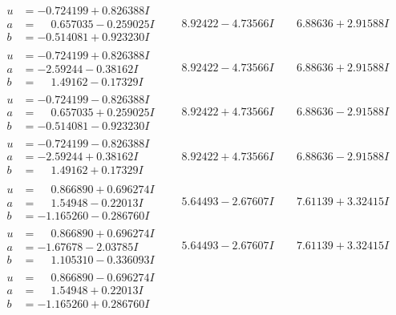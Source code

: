 \documentclass[1p]{elsarticle_modified}
\theoremstyle{definition}
\begin{document}
$$\begin{array}{c|c|c}
\begin{aligned}
u &= -0.724199 + 0.826388 I \\
a &= \phantom{-}0.657035 - 0.259025 I \\
b &= -0.514081 + 0.923230 I\end{aligned}
 & \phantom{-}8.92422 - 4.73566 I & \phantom{-}6.88636 + 2.91588 I \\ \hline\begin{aligned}
u &= -0.724199 + 0.826388 I \\
a &= -2.59244 - 0.38162 I \\
b &= \phantom{-}1.49162 - 0.17329 I\end{aligned}
 & \phantom{-}8.92422 - 4.73566 I & \phantom{-}6.88636 + 2.91588 I \\ \hline\begin{aligned}
u &= -0.724199 - 0.826388 I \\
a &= \phantom{-}0.657035 + 0.259025 I \\
b &= -0.514081 - 0.923230 I\end{aligned}
 & \phantom{-}8.92422 + 4.73566 I & \phantom{-}6.88636 - 2.91588 I \\ \hline\begin{aligned}
u &= -0.724199 - 0.826388 I \\
a &= -2.59244 + 0.38162 I \\
b &= \phantom{-}1.49162 + 0.17329 I\end{aligned}
 & \phantom{-}8.92422 + 4.73566 I & \phantom{-}6.88636 - 2.91588 I \\ \hline\begin{aligned}
u &= \phantom{-}0.866890 + 0.696274 I \\
a &= \phantom{-}1.54948 - 0.22013 I \\
b &= -1.165260 - 0.286760 I\end{aligned}
 & \phantom{-}5.64493 - 2.67607 I & \phantom{-}7.61139 + 3.32415 I \\ \hline\begin{aligned}
u &= \phantom{-}0.866890 + 0.696274 I \\
a &= -1.67678 - 2.03785 I \\
b &= \phantom{-}1.105310 - 0.336093 I\end{aligned}
 & \phantom{-}5.64493 - 2.67607 I & \phantom{-}7.61139 + 3.32415 I \\ \hline\begin{aligned}
u &= \phantom{-}0.866890 - 0.696274 I \\
a &= \phantom{-}1.54948 + 0.22013 I \\
b &= -1.165260 + 0.286760 I\end{aligned}

\end{array}$$
\end{document}

